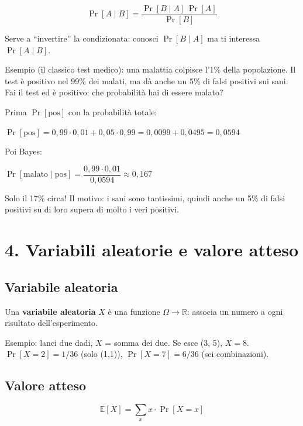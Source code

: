 \[
\Pr[A \mid B] = \frac{\Pr[B \mid A]\,\Pr[A]}{\Pr[B]}
\]

Serve a ``invertire'' la condizionata: conosci \(\Pr[B \mid A]\) ma ti interessa \(\Pr[A \mid B]\).

\begin{esempio}

Esempio (il classico test medico): una malattia colpisce l'1\% della popolazione. Il test è positivo nel 99\% dei malati, ma dà anche un 5\% di falsi positivi sui sani. Fai il test ed è positivo: che probabilità hai di essere malato?

Prima \(\Pr[\text{pos}]\) con la probabilità totale:

\(\Pr[\text{pos}] = 0{,}99 \cdot 0{,}01 + 0{,}05 \cdot 0{,}99 = 0{,}0099 + 0{,}0495 = 0{,}0594\)

Poi Bayes:

\(\Pr[\text{malato} \mid \text{pos}] = \dfrac{0{,}99 \cdot 0{,}01}{0{,}0594} \approx 0{,}167\)

Solo il 17\% circa! Il motivo: i sani sono tantissimi, quindi anche un 5\% di falsi positivi su di loro supera di molto i veri positivi.

\end{esempio}

\section{4. Variabili aleatorie e valore atteso}

\subsection{Variabile aleatoria}

Una \textbf{variabile aleatoria} \(X\) è una funzione \(\Omega \to \mathbb{R}\): associa un numero a ogni risultato dell'esperimento.

\begin{esempio}

Esempio: lanci due dadi, \(X\) = somma dei due. Se esce (3, 5), \(X = 8\). \(\Pr[X = 2] = 1/36\) (solo (1,1)), \(\Pr[X = 7] = 6/36\) (sei combinazioni).

\end{esempio}

\subsection{Valore atteso}

\[
\mathbb{E}[X] = \sum_x x \cdot \Pr[X = x]
\]

